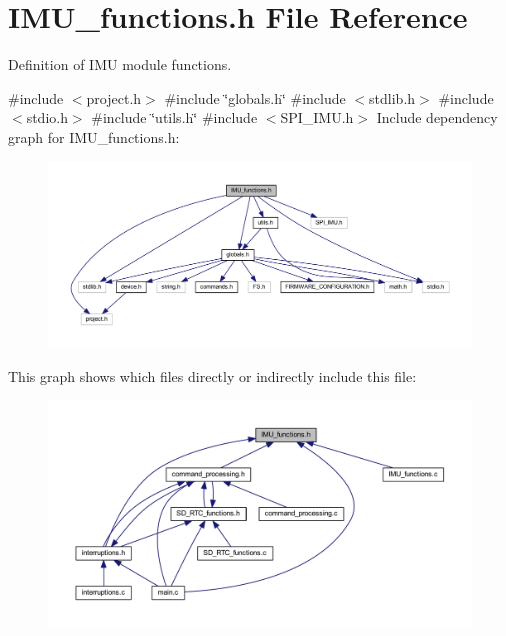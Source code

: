 \section{I\+M\+U\+\_\+functions.\+h File Reference}
\label{_i_m_u__functions_8h}


Definition of I\+MU module functions.  


{\ttfamily \#include $<$project.\+h$>$}\newline
{\ttfamily \#include \char`\"{}globals.\+h\char`\"{}}\newline
{\ttfamily \#include $<$stdlib.\+h$>$}\newline
{\ttfamily \#include $<$stdio.\+h$>$}\newline
{\ttfamily \#include \char`\"{}utils.\+h\char`\"{}}\newline
{\ttfamily \#include $<$S\+P\+I\+\_\+\+I\+M\+U.\+h$>$}\newline
Include dependency graph for I\+M\+U\+\_\+functions.\+h\+:\nopagebreak
\begin{figure}[H]
\begin{center}
\leavevmode
\includegraphics[width=350pt]{_i_m_u__functions_8h__incl}
\end{center}
\end{figure}
This graph shows which files directly or indirectly include this file\+:\nopagebreak
\begin{figure}[H]
\begin{center}
\leavevmode
\includegraphics[width=350pt]{_i_m_u__functions_8h__dep__incl}
\end{center}
\end{figure}
